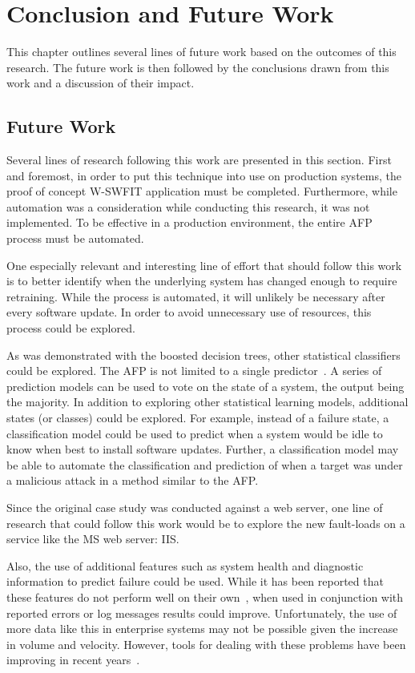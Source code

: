 \chapter{Conclusion and Future Work} \label{chapter5}
This chapter outlines several lines of future work based on the outcomes of
this research.  The future work is then followed by the conclusions drawn from
this work and a discussion of their impact.

\section{Future Work}
Several lines of research following this work are presented in this section.
First and foremost, in order to put this technique into use on production
systems, the proof of concept \ac{W-SWFIT} application must be completed.
Furthermore, while automation was a consideration while conducting this
research, it was not implemented.  To be effective in a production environment,
the entire \ac{AFP} process must be automated.

One especially relevant and interesting line of effort that should follow this
work is to better identify when the underlying system has changed enough to
require retraining.  While the process is automated, it will unlikely be
necessary after every software update.  In order to avoid unnecessary use of
resources, this process could be explored.

As was demonstrated with the boosted decision trees, other statistical
classifiers could be explored.  The \ac{AFP} is not limited to a single
predictor~\cite{irrera2015}.  A series of prediction models can be used to vote
on the state of a system, the output being the majority.  In addition to
exploring other statistical learning models, additional states (or classes)
could be explored.  For example, instead of a failure state, a classification
model could be used to predict when a system would be idle to know when best to
install software updates.  Further, a classification model may be able to
automate the classification and prediction of when a target was under a
malicious attack in a method similar to the \ac{AFP}.

Since the original case study was conducted against a web server, one line of
research that could follow this work would be to explore the new fault-loads on
a service like the \ac{MS} web server: \ac{IIS}.  

Also, the use of additional features such as system health and diagnostic
information to predict failure could be used.  While it has been reported that
these features do not perform well on their own~\cite{salfnerSurvey}, when used
in conjunction with reported errors or log messages results could improve.
Unfortunately, the use of more data like this in enterprise systems may not be
possible given the increase in volume and velocity.  However, tools for dealing
with these problems have been improving in recent years~\cite{meng2016}.

